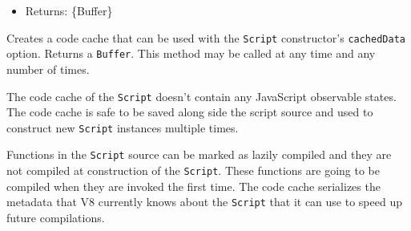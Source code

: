 \begin{itemize}
\tightlist
\item
  Returns: \{Buffer\}
\end{itemize}

Creates a code cache that can be used with the \texttt{Script}
constructor's \texttt{cachedData} option. Returns a \texttt{Buffer}.
This method may be called at any time and any number of times.

The code cache of the \texttt{Script} doesn't contain any JavaScript
observable states. The code cache is safe to be saved along side the
script source and used to construct new \texttt{Script} instances
multiple times.

Functions in the \texttt{Script} source can be marked as lazily compiled
and they are not compiled at construction of the \texttt{Script}. These
functions are going to be compiled when they are invoked the first time.
The code cache serializes the metadata that V8 currently knows about the
\texttt{Script} that it can use to speed up future compilations.

\begin{Shaded}
\begin{Highlighting}[]
\OperatorTok{=} \NormalTok{(}\VerbatimStringTok{\textasciigrave{}}
\VerbatimStringTok{\}}

\VerbatimStringTok{\textasciigrave{}}\NormalTok{)}\OperatorTok{;}

\OperatorTok{=}\NormalTok{()}\OperatorTok{;}

\NormalTok{()}\OperatorTok{;}

\OperatorTok{=}\NormalTok{()}\OperatorTok{;}
\end{Highlighting}
\end{Shaded}

